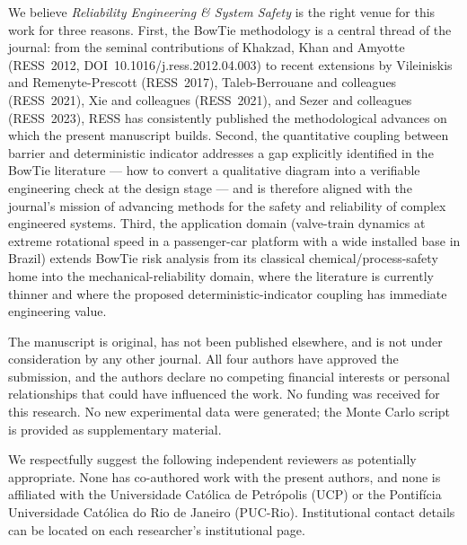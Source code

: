 \documentclass[11pt,a4paper]{article}
\begin{document}
We believe \emph{Reliability Engineering \& System Safety} is the
right venue for this work for three reasons. First, the BowTie
methodology is a central thread of the journal: from the seminal
contributions of Khakzad, Khan and Amyotte (RESS~2012,
DOI~10.1016/j.ress.2012.04.003) to recent extensions by Vileiniskis
and Remenyte-Prescott (RESS~2017), Taleb-Berrouane and colleagues
(RESS~2021), Xie and colleagues (RESS~2021), and Sezer and colleagues
(RESS~2023), RESS has consistently published the methodological
advances on which the present manuscript builds. Second, the
quantitative coupling between barrier and deterministic indicator
addresses a gap explicitly identified in the BowTie literature ---
how to convert a qualitative diagram into a verifiable engineering
check at the design stage --- and is therefore aligned with the
journal's mission of advancing methods for the safety and reliability
of complex engineered systems. Third, the application domain
(valve-train dynamics at extreme rotational speed in a passenger-car
platform with a wide installed base in Brazil) extends BowTie risk
analysis from its classical chemical/process-safety home into the
mechanical-reliability domain, where the literature is currently
thinner and where the proposed deterministic-indicator coupling has
immediate engineering value.

The manuscript is original, has not been published elsewhere, and is
not under consideration by any other journal. All four authors have
approved the submission, and the authors declare no competing
financial interests or personal relationships that could have
influenced the work. No funding was received for this research. No
new experimental data were generated; the Monte Carlo script is
provided as supplementary material.

We respectfully suggest the following independent reviewers as
potentially appropriate. None has co-authored work with the present
authors, and none is affiliated with the Universidade Cat\'olica de
Petr\'opolis (UCP) or the Pontif\'icia Universidade Cat\'olica do Rio
de Janeiro (PUC-Rio). Institutional contact details can be located on
each researcher's institutional page.
\end{document}
